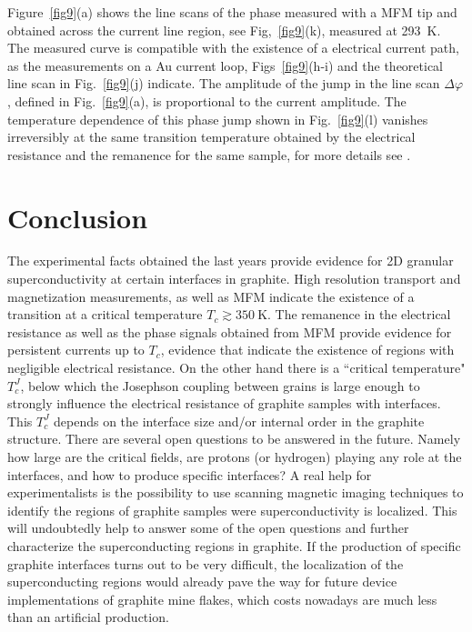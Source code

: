 \documentclass[aps,dvipsnames,twocolumn,floatfix,amsmath]{revtex4-1}
\begin{document}
Figure~\ref{fig9}(a) shows the line scans of the phase measured with a MFM tip and obtained across
the current line region, see Fig,~\ref{fig9}(k), measured at 293~K. The measured curve is compatible with
the existence of a electrical current
path, as the measurements on a Au current loop, Figs~\ref{fig9}(h-i) and the theoretical
line scan in Fig.~\ref{fig9}(j) indicate. The amplitude of the
jump in the line scan $\Delta \varphi$, defined in Fig.~\ref{fig9}(a), is proportional to the
current amplitude. The temperature dependence of this phase jump shown in
Fig.~\ref{fig9}(l) vanishes irreversibly at the same transition temperature obtained by
the electrical resistance  and  the remanence for the same sample, for more details see \cite{sti17}.

\section{Conclusion}
\label{Con}

The experimental facts obtained the last  years provide evidence for 2D
granular superconductivity at certain interfaces in graphite.
High resolution transport and magnetization measurements, as well as MFM
indicate the existence of a transition at a critical temperature $T_c \gtrsim 350~$K. The remanence in the electrical resistance
as well as the phase signals obtained from MFM provide evidence  for persistent currents up to $T_c$, evidence
that indicate the existence of regions with negligible electrical resistance.
On the other hand there is a  ``critical temperature" $T_c^J$, below which the  Josephson coupling
between grains is large enough to strongly
influence the electrical resistance of graphite samples with interfaces. This   $T_c^J$
depends on the interface size and/or internal order in the graphite structure.
There are several open questions to be answered in the future. Namely
how large are the critical fields, are protons (or hydrogen) playing any role at the interfaces,
and how to produce specific interfaces? A real help for experimentalists is the possibility
to use scanning magnetic
imaging techniques  to identify the regions of graphite
samples were superconductivity is localized. This will undoubtedly
help to answer some of the open questions and further characterize the superconducting regions
in graphite. If the production of specific graphite interfaces
turns out to be very difficult, the localization of the superconducting regions would
already  pave the way for
future device implementations of graphite mine flakes, which costs nowadays are much less than
an artificial production.
\end{document}
